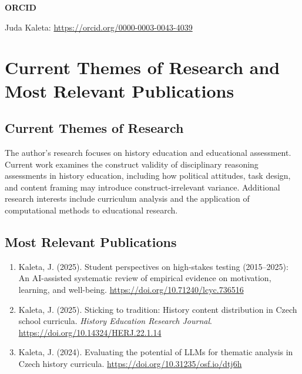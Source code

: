 \documentclass[pdflatex,sn-apa]{sn-jnl}%
\begin{document}
\maketitle


\noindent\textbf{ORCID}

\medskip
\noindent Juda Kaleta: \url{https://orcid.org/0000-0003-0043-4039}


\section*{Current Themes of Research and Most Relevant Publications}

\subsection*{Current Themes of Research}

The author's research focuses on history education and educational assessment. Current work examines the construct validity of disciplinary reasoning assessments in history education, including how political attitudes, task design, and content framing may introduce construct-irrelevant variance. Additional research interests include curriculum analysis and the application of computational methods to educational research.

\subsection*{Most Relevant Publications}

\begin{enumerate}
    \item Kaleta, J. (2025). Student perspectives on high-stakes testing (2015--2025): An AI-assisted systematic review of empirical evidence on motivation, learning, and well-being. \url{https://doi.org/10.71240/lcyc.736516}
    \item Kaleta, J. (2025). Sticking to tradition: History content distribution in Czech school curricula. \textit{History Education Research Journal}. \url{https://doi.org/10.14324/HERJ.22.1.14}
    \item Kaleta, J. (2024). Evaluating the potential of LLMs for thematic analysis in Czech history curricula. \url{https://doi.org/10.31235/osf.io/dtj6h}
\end{enumerate}
\end{document}
